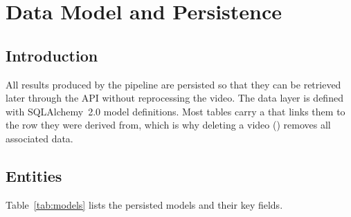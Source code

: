\chapter{Data Model and Persistence}

\section{Introduction}

All results produced by the pipeline are persisted so that they can be retrieved later through the API without reprocessing the video. The data layer is defined with SQLAlchemy~2.0 model definitions. Most tables carry a  that links them to the  row they were derived from, which is why deleting a video () removes all associated data.

\section{Entities}

Table~\ref{tab:models} lists the persisted models and their key fields.

